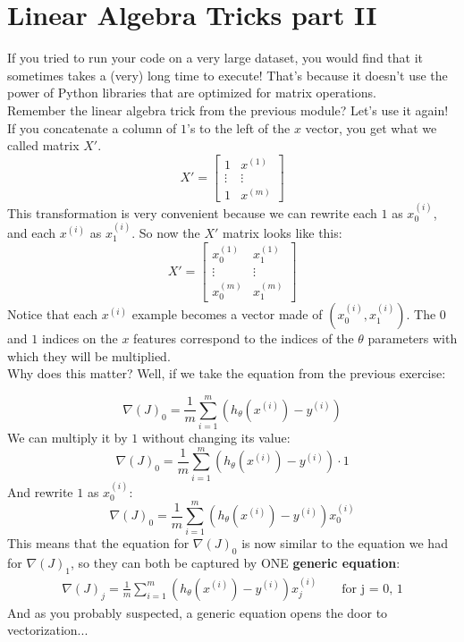 
\section*{Linear Algebra Tricks part II}

If you tried to run your code on a very large dataset, you would find that it sometimes takes a (very) long time to execute!
That's because it doesn't use the power of Python libraries that are optimized for matrix operations.\\
\newline
Remember the linear algebra trick from the previous module? Let's use it again!  
If you concatenate a column of $1$'s to the left of the $x$ vector, you get what we called matrix $X'$.   
$$
X' = \begin{bmatrix} 1 & x^{(1)} \\ \vdots & \vdots \\ 1 & x^{(m)}\end{bmatrix}
$$
This transformation is very convenient because we can rewrite each $1$ as $x_0^{(i)}$, and each $x^{(i)}$ as $x_1^{(i)}$.
So now the $X'$ matrix looks like this:
$$
X' = \begin{bmatrix} x_0^{(1)} & x_1^{(1)} \\ \vdots & \vdots \\ x_0^{(m)} & x_1^{(m)}\end{bmatrix}
$$
Notice that each $x^{(i)}$ example becomes a vector made of $(x^{(i)}_0, x^{(i)}_1)$.  
The $0$ and $1$ indices on the $x$ features correspond to the indices of the $\theta$ parameters with which they will be multiplied.\\
\newline
Why does this matter?
Well, if we take the equation from the previous exercise:

$$
\nabla(J)_0 = \frac{1}{m}\sum_{i=1}^{m}(h_{\theta}(x^{(i)}) - y^{(i)})
$$
We can multiply it by $1$ without changing its value:
$$
\nabla(J)_0 = \frac{1}{m}\sum_{i=1}^{m}(h_{\theta}(x^{(i)}) - y^{(i)}) \cdot 1
$$
And rewrite $1$ as $x_0^{(i)}$:
$$
\nabla(J)_0 = \frac{1}{m}\sum_{i=1}^{m}(h_{\theta}(x^{(i)}) - y^{(i)})x_{0}^{(i)}
$$
This means that the equation for $\nabla(J)_0$ is now similar to the equation we had for $\nabla(J)_1$, so they can both be captured by ONE \textbf{generic equation}:
$$
\begin{matrix}
\nabla(J)_j = \frac{1}{m}\sum_{i=1}^{m}(h_{\theta}(x^{(i)}) - y^{(i)})x_{j}^{(i)} & & \text{ for j = 0, 1}    
\end{matrix}
$$
And as you probably suspected, a generic equation opens the door to vectorization...


